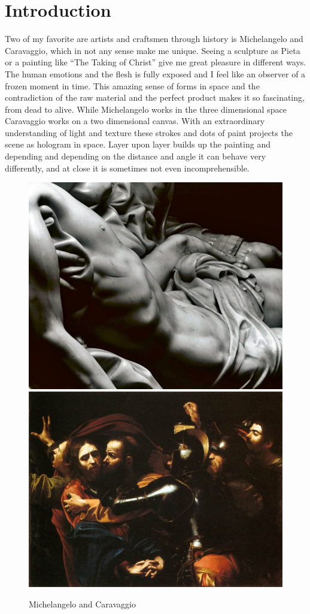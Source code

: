 \chapter{Introduction}

Two of my favorite are artists and craftsmen through history is Michelangelo and Caravaggio, which in not any sense make me unique. Seeing a sculpture as Pieta or a painting like “The Taking of Christ” give me great pleasure in different ways. The human emotions and the flesh is fully exposed and I feel like an observer of a frozen moment in time. This amazing sense of forms in space and the contradiction of the raw material and the perfect product makes it so fascinating, from dead to alive. 
While Michelangelo works in the three dimensional space Caravaggio works on a two dimensional canvas. With an extraordinary understanding of light and texture these strokes and dots of paint projects the scene as hologram in space. Layer upon layer builds up the painting and depending and depending on the distance and angle it can behave very differently, and at close it is sometimes not even incomprehensible.

\begin{figure}[H]
\centering
\includegraphics[height=0.39\linewidth ]{figure/Introduction/Mich.jpg}
\includegraphics[height=0.39\linewidth ]{figure/Introduction/Caravaggio.jpg}
\caption{Michelangelo and Caravaggio}
\end{figure}



